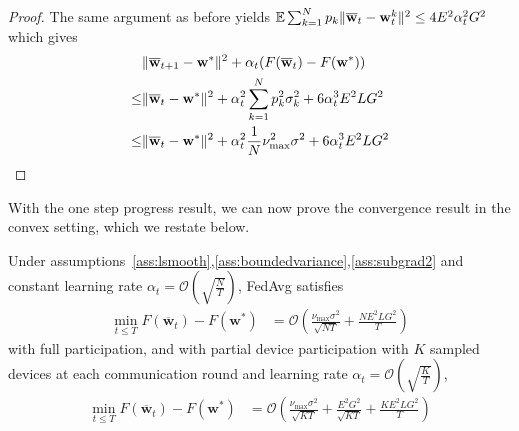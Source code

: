 \begin{proof}
	The same argument as before yields $\mathbb{E}\sum_{k=1}^{N}p_{k}\|{\overline{\mathbf{w}}}_{t}-{\mathbf{w}}_{t}^{k}\|^{2}\leq4E^{2}\alpha_{t}^{2}G^{2}$
	which gives 
	\begin{align*}
	&\|{\overline{\mathbf{w}}}_{t+1}-{\mathbf{w}}^{\ast}\|^{2}+\alpha_{t}(F({\overline{\mathbf{w}}}_{t})-F({\mathbf{w}}^{\ast}))\\  \leq &\|{\overline{\mathbf{w}}}_{t}-{\mathbf{w}}^{\ast}\|^{2}
	+\alpha_{t}^{2}\sum_{k=1}^{N}p_{k}^{2}\sigma_{k}^{2}+6\alpha_{t}^{3}E^{2}LG^{2}\\ 
	\leq &\|{\overline{\mathbf{w}}}_{t}-{\mathbf{w}}^{\ast}\|^{2}+\alpha_{t}^{2}\frac{1}{N}\nu_{\max}^{2}\sigma^{2}+6\alpha_{t}^{3}E^{2}LG^{2}
	\end{align*}
\end{proof}
With the one step progress result, we can now prove the convergence result in the convex setting, which we restate below.
\begin{thm}
	Under assumptions~\ref{ass:lsmooth},\ref{ass:boundedvariance},\ref{ass:subgrad2} and constant learning
	rate $\alpha_{t}=\mathcal{O}(\sqrt{\frac{N}{T}})$, FedAvg satisfies
	\begin{align*}
	\min_{t\leq T}F(\overline{\mathbf{w}}_{t})-F(\mathbf{w}^{\ast}) & =\mathcal{O}\left(\frac{\nu_{\max}\sigma^{2}}{\sqrt{NT}}+\frac{NE^{2}LG^{2}}{T}\right)
	\end{align*}
	with full participation, and with partial device participation with $K$ sampled devices at
	each communication round and learning rate $\alpha_{t}=\mathcal{O}(\sqrt{\frac{K}{T}})$,
	\begin{align*}
	\min_{t\leq T}F(\overline{\mathbf{w}}_{t})-F(\mathbf{w}^{\ast}) & =\mathcal{O}\left(\frac{\nu_{\max}\sigma^{2}}{\sqrt{KT}}+\frac{E^{2}G^{2}}{\sqrt{KT}}+\frac{KE^{2}LG^{2}}{T}\right)
	\end{align*}
\end{thm}

